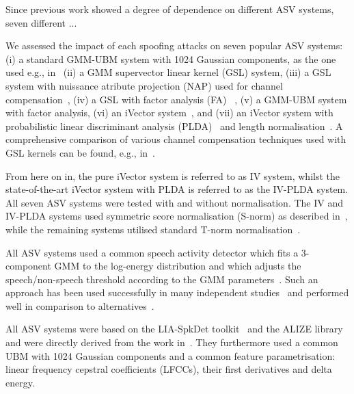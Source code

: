 
Since previous work showed a degree of dependence on different ASV systems, seven different ... 

We assessed the impact of each spoofing attacks on seven popular ASV systems: (i) a standard GMM-UBM system with 1024 Gaussian components, as the one used e.g., in~\cite{Roy2012} (ii) a GMM supervector linear kernel (GSL) system, (iii) a GSL system with nuissance atribute projection (NAP) used for channel compensation~\cite{Campbell2006}, (iv) a GSL with factor analysis (FA) ~\cite{Fauve2007}, (v) a GMM-UBM system with factor analysis, (vi) an iVector system~\cite{Dehak2011}, and (vii) an iVector system  with probabilistic linear discriminant analysis (PLDA)~\cite{Li2012} and length normalisation~\cite{Garcia2011}. A comprehensive comparison of various channel compensation techniques used with GSL kernels can be found, e.g., in~\cite{McLaren2010}.

From here on in, the pure iVector system is referred to as IV system, whilst the state-of-the-art iVector system with PLDA is referred to as the IV-PLDA system. All seven ASV systems were tested with and without normalisation. The IV and IV-PLDA systems used symmetric score normalisation (S-norm) as described in~\cite{Kenny2010}, while the remaining systems utilised standard T-norm normalisation~\cite{Auckenthaler2000}.

All ASV systems used a common speech activity detector which fits a 3-component GMM to the log-energy distribution and which adjusts the speech/non-speech threshold according to the GMM parameters~\cite{Bimbot2004}.  Such an approach has been used successfully in many independent studies~\cite{magrin2001,fauve2008} and performed well in comparison to alternatives~\cite{sahidullah2012}. 

All ASV systems were based on the LIA-SpkDet toolkit~\cite{Bonastre2008} and the ALIZE library~\cite{Bonastre2004} and were directly derived from the work in~\cite{Fauve2007}.  They furthermore used a common UBM with 1024 Gaussian components and a common feature parametrisation: linear frequency cepstral coefficients (LFCCs), their first derivatives and delta energy.  




